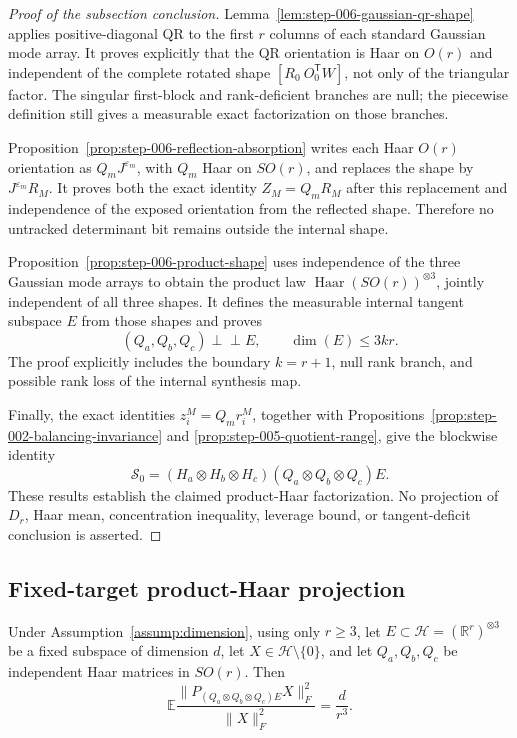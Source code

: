 \begin{proof}[Proof of the subsection conclusion]

Lemma~\ref{lem:step-006-gaussian-qr-shape} applies positive-diagonal QR to
the first \(r\) columns of each standard Gaussian mode array. It proves
explicitly that the QR orientation is Haar on \(O(r)\) and
independent of the complete rotated shape
\([R_0\ O_0^{\mathsf T}W]\), not only of the triangular factor. The singular
first-block and rank-deficient branches are null; the piecewise definition
still gives a measurable exact factorization on those branches.

Proposition~\ref{prop:step-006-reflection-absorption} writes each Haar
\(O(r)\) orientation as \(Q_mJ^{\varepsilon_m}\), with \(Q_m\) Haar on
\(SO(r)\), and replaces the shape by \(J^{\varepsilon_m}R_M\). It proves both
the exact identity \(Z_M=Q_mR_M\) after this replacement and independence of
the exposed orientation from the reflected shape. Therefore no untracked
determinant bit remains outside the internal shape.

Proposition~\ref{prop:step-006-product-shape} uses independence of the three
Gaussian mode arrays to obtain the product law
  \(\operatorname{Haar}(SO(r))^{\otimes3}\), jointly independent of all three
shapes. It defines the measurable internal tangent subspace \(E\) from those
shapes and proves
\[
  (Q_a,Q_b,Q_c)\perp\!\!\!\perp E,
  \qquad \dim(E)\le3kr.
\]
The proof explicitly includes the boundary \(k=r+1\), null rank branch, and
possible rank loss of the internal synthesis map.

Finally, the exact identities \(z_i^M=Q_mr_i^M\), together with
Propositions~\ref{prop:step-002-balancing-invariance} and
\ref{prop:step-005-quotient-range}, give the blockwise identity
\[
  \mathscr S_0
  =(H_a\otimes H_b\otimes H_c)
   (Q_a\otimes Q_b\otimes Q_c)E.
\]
These results establish the claimed product-Haar factorization. No
projection of \(D_r\), Haar mean, concentration inequality, leverage bound,
or tangent-deficit conclusion is asserted.

\end{proof}

\subsection{Fixed-target product-Haar projection}\label{app:step-007}

\begin{lemma}
\label{lem:step-007-sequential-twirl}
Under Assumption~\ref{assump:dimension}, using only \(r\ge3\), let
\(E\subset\mathcal H=(\mathbb R^r)^{\otimes3}\) be a fixed subspace of
dimension \(d\), let \(X\in\mathcal H\setminus\{0\}\), and let
\(Q_a,Q_b,Q_c\) be independent Haar matrices in \(SO(r)\). Then
\begin{equation}
  \mathbb E\frac{\|P_{(Q_a\otimes Q_b\otimes Q_c)E}X\|_F^2}
  {\|X\|_F^2}
  =\frac d{r^3}.                                             \label{eq:step-007-6}
\end{equation}

\end{lemma}

